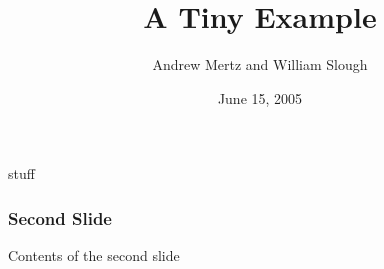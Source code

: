 \documentclass{beamer}
\title{A Tiny Example}
\author{Andrew Mertz and William Slough}
\date{June 15, 2005}
\begin{document}
\maketitle

\begin{frame}
		stuff
\end{frame}

\begin{frame}
	\frametitle{Second Slide}
	Contents of the second slide
\end{frame}
\end{document}
